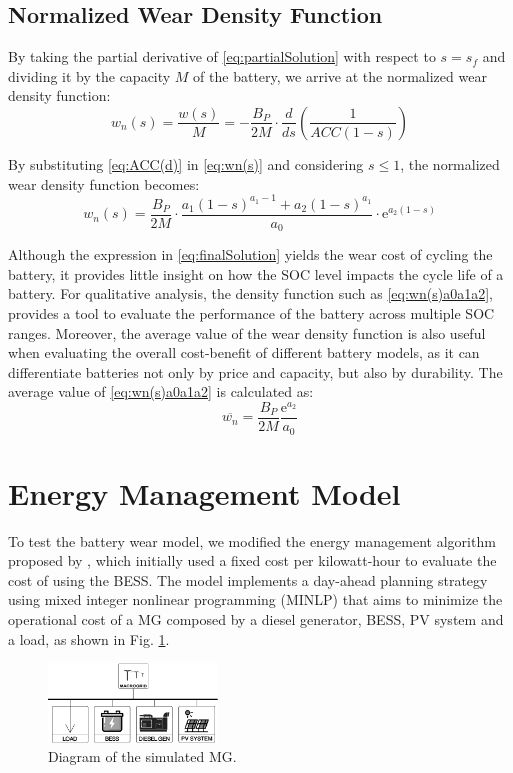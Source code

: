 \documentclass{ieeeaccess}
\begin{document}
    \subsection{Normalized Wear Density Function}
    By taking the partial derivative of \eqref{eq:partialSolution} with respect to $s=s_f$ and dividing it by the capacity $M$ of the battery, we arrive at the normalized wear density function:
    \begin{equation}
        w_n(s) = \frac{w(s)}{M} = - \frac{B_P}{2M} \cdot \frac{d}{ds} \left( \frac{1}{ACC(1-s)} \right)
        \label{eq:wn(s)}
    \end{equation}

    By substituting \eqref{eq:ACC(d)} in \eqref{eq:wn(s)} and considering $s \le 1$, the normalized wear density function becomes:
    \begin{equation}
        w_n(s) = \frac{B_P}{2M} \cdot \frac{a_1(1-s)^{a_1-1} + a_2(1-s)^{a_1}}{a_0} \cdot \mathrm{e}^{a_2(1-s)}
        \label{eq:wn(s)a0a1a2}
    \end{equation}

    Although the expression in \eqref{eq:finalSolution} yields the wear cost of cycling the battery, it provides little insight on how the SOC level impacts the cycle life of a battery. For qualitative analysis, the density function such as \eqref{eq:wn(s)a0a1a2}, provides a tool to evaluate the performance of the battery across multiple SOC ranges. Moreover, the average value of the wear density function is also useful when evaluating the overall cost-benefit of different battery models, as it can differentiate batteries not only by price and capacity, but also by durability. The average value of \eqref{eq:wn(s)a0a1a2} is calculated as:
    \begin{equation}
        \overline{w_n} = \frac{B_P}{2M} \frac{\mathrm{e}^{a_2}}{a_0}
    \end{equation}

    \section{Energy Management Model}
    To test the battery wear model, we modified the energy management algorithm proposed by \cite{SANTOS2018}, which initially used a fixed cost per kilowatt-hour to evaluate the cost of using the BESS. The model implements a day-ahead planning strategy using mixed integer nonlinear programming (MINLP) that aims to minimize the operational cost of a MG composed by a diesel generator, BESS, PV system and a load, as shown in Fig. \ref{fig:mg1}.
    \begin{figure}[htbp]
        \centering
        \includegraphics[width=0.4\textwidth]{figures/mg2.png}
        \caption{Diagram of the simulated MG.}
        \label{fig:mg1}
    \end{figure}
\end{document}
